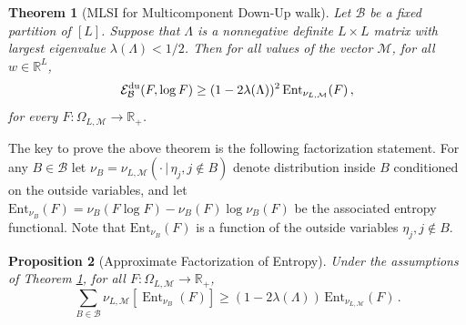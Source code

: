 \documentclass[11pt,reqno]{amsart}
\numberwithin{equation}{section}
\numberwithin{figure}{section}
\newtheorem{theorem}{Theorem}[section]
\newtheorem{proposition}[theorem]{Proposition}
\newcommand{\1}{\mathds{1}}
\newcommand{\tc}{\,|\,}
\newcommand{\cB}{\ensuremath{\mathcal B}}
\newcommand{\cM}{\ensuremath{\mathcal M}}
\newcommand{\bbR}{{\ensuremath{\mathbb R}} }
\begin{document}
\begin{theorem}[MLSI for Multicomponent Down-Up walk]\label{MLSI DOWN UP MC}
Let $\cB$ be a fixed partition of $[L]$. Suppose that \(\Lambda\) is a nonnegative definite $L\times L$ matrix with largest eigenvalue \(\lambda(\Lambda) < 1/2\). Then %
for all values of the vector $\cM$, for all $w\in\bbR^L$,
\begin{equation}\label{MLSIB}
\mathcal{E}^{\rm du}_\cB(F, \log F)\ge (1 - 2\lambda(\Lambda))^2\, \mathrm{Ent}_{\nu_{L,\cM}} (F) \,,
\end{equation}
for every \(F : \Omega_{L,\cM} \to \bbR_+\).
\end{theorem}
The key to prove the above theorem is the following factorization statement. For any $B\in\cB$ let $\nu_B=\nu_{L,\cM}(\cdot\tc \eta_j,j\notin B)$ denote distribution inside $B$ conditioned on the outside variables, and let  
$\mathrm{Ent}_{\nu_B}(F)=\nu_B(F\log F)-\nu_B(F)\log\nu_B(F)$ be the associated entropy functional. Note that $\mathrm{Ent}_{\nu_B}(F)$ is a function of the outside variables $\eta_j,j\notin B$.
\begin{proposition}[Approximate Factorization of Entropy]\label{approximate tensorization of entropy over components}
Under the assumptions of Theorem \ref{MLSI DOWN UP MC}, for all $F:\Omega_{L,\cM} \to \bbR_+$, 
\begin{equation}\label{MLSIBa}
\sum_{B \in \mathcal{B}} \nu_{L,\cM}\left[\operatorname{Ent}_{\nu_B}(F)\right]\ge (1 - 2\lambda(\Lambda))\, \mathrm{Ent}_{\nu_{L,\cM}}(F) \,.
\end{equation}
\end{proposition}
\end{document}
